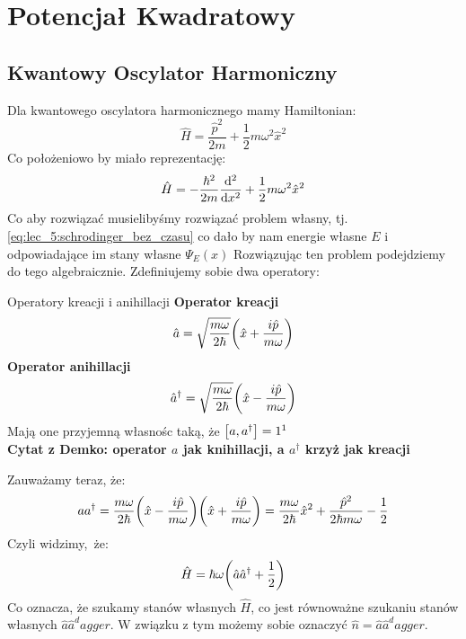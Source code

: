 \documentclass[12pt,a4paper]{report}
\newcommand{\subind}[2]{{\color{blue} #1\index{#2}}}
\newcommand{\phat}{\hat{p}}
\renewcommand{\emph}{\textbf}
\newenvironment{lecture}[1]{\par\medskip
   \noindent\chapter{#1} \rmfamily}{\medskip}
\newenvironment{emph_box}[1]
    {\begin{center}\color{BrickRed}
    \begin{tabular}{|p{0.9\textwidth}|}
    \hline
    \begin{center} \color{Dandelion}{\textbf{#1}} \end{center}
    \begin{center}
    }
    {
    \end{center}
    \\\\\hline
    \end{tabular} 
    \end{center}
    \color{black}
    }
\begin{document}
\begin{lecture}{Potencjał Kwadratowy}
    \section{Kwantowy Oscylator Harmoniczny}
    Dla kwantowego oscylatora harmonicznego mamy Hamiltonian:
    \[
        \hat{H} = \frac{\hat{p}^2}{2m} + \frac12 m \omega^2 \hat{x}^2
    \]
    {\color{TealBlue}
    Co położeniowo by miało reprezentację:
    \[
        \hat{H} = - \frac{\hbar^2}{2m} \dv[2]{x} + \frac12 m \omega^2 \hat{x}^2
    \]
    Co aby rozwiązać musielibyśmy rozwiązać problem własny, tj. \eqref{eq:lec_5:schrodinger_bez_czasu} co dało by nam energie własne $E$ i odpowiadające im stany własne $\Psi_E(x)$
    }
    Rozwiązując ten problem podejdziemy do tego algebraicznie. Zdefiniujemy sobie dwa operatory:
    \begin{emph_box}{\subind{Operatory kreacji i anihillacji}{Operator!Kreacji}}
    \emph{Operator kreacji}
        \begin{equation}
            \hat{a} = \sqrt{\frac{m \omega}{2 \hbar}}\qty(\hat{x} + \frac{i \hat{p}}{m \omega})
            \label{eq:lec_9:operator_anihillacji}
        \end{equation}
        \emph{Operator anihillacji}
        \begin{equation}
            \hat{a}^\dagger = \sqrt{\frac{m \omega}{2 \hbar}}\qty(\hat{x} - \frac{i \hat{p}}{m \omega})
            \label{eq:lec_9:operator_kreacji}
        \end{equation}
        Mają one przyjemną własnośc taką, że $\comm{a}{a^\dagger} = 1\footnotemark$\\
        \textbf{Cytat z Demko: operator $a$ jak knihillacji, a $a^\dagger$ krzyż jak kreacji}
    \end{emph_box}
    Zauważamy teraz, że:
    \[
        a a^\dagger = \frac{m \omega}{2 \hbar} \qty(\hat{x} - \frac{i \hat{p}}{m \omega})\qty(\hat{x} + \frac{i \hat{p}}{m \omega}) = \frac{m\omega}{2\hbar} \hat{x}^2 + \frac{\phat^2}{2 \hbar m \omega} - \frac12
    \]
    Czyli widzimy, że:
    \[
        \hat{H} = \hbar \omega\qty(\hat{a}\hat{a}^\dagger + \frac12)
    \]
    Co oznacza, że szukamy stanów własnych $\hat{H}$, co jest równoważne szukaniu stanów własnych $\hat{a}\hat{a}^dagger$. W związku z tym możemy sobie oznaczyć $\hat{n} = \hat{a}\hat{a}^dagger$.

\end{lecture}
\end{document}
